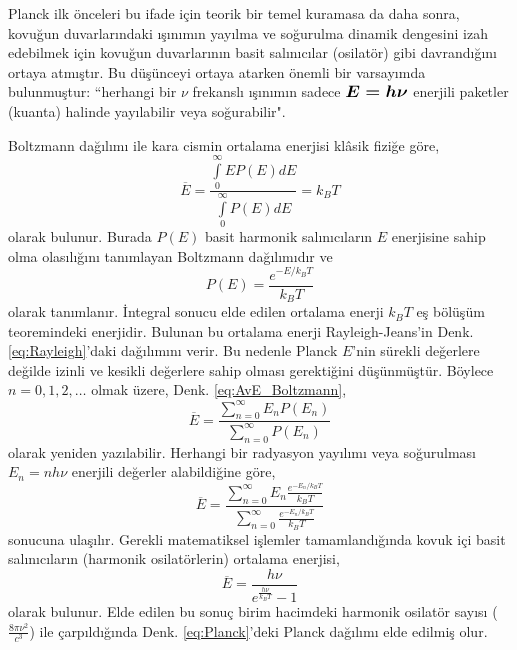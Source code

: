 \documentclass[a4paper,12pt, twoside]{article}
\begin{document}
Planck ilk önceleri bu ifade için teorik bir temel kuramasa da daha sonra, kovuğun duvarlarındaki ışınımın yayılma ve soğurulma dinamik dengesini izah edebilmek için kovuğun duvarlarının basit salınıcılar (osilatör) gibi davrandığını ortaya atmıştır. Bu düşünceyi ortaya atarken önemli bir varsayımda bulunmuştur: ``herhangi bir  $\nu$ frekanslı ışınımın sadece $\large \boldsymbol{E=h\nu}$ enerjili paketler (kuanta) halinde yayılabilir veya soğurabilir".

Boltzmann dağılımı ile kara cismin ortalama enerjisi klâsik fiziğe göre,
\begin{equation}
\label{eq:AvE_Boltzmann}
\overline E =\frac{\int \limits_0^\infty E P(E) dE}{\int \limits_0^\infty P(E) dE} = k_B T
\end{equation} 
olarak bulunur. Burada $P(E)$ basit harmonik salınıcıların $E$ enerjisine sahip olma olasılığını tanımlayan Boltzmann dağılımıdır ve
\begin{equation}
\label{eq:Boltzmann}
P(E) = \frac{e^{-E/k_BT}}{k_BT}
\end{equation} 
olarak tanımlanır. İntegral sonucu elde edilen ortalama enerji $k_B T$ eş bölüşüm teoremindeki enerjidir. Bulunan bu ortalama enerji Rayleigh-Jeans'in Denk. \ref{eq:Rayleigh}'daki dağılımını verir. Bu nedenle Planck $E$'nin sürekli değerlere değilde izinli ve kesikli değerlere sahip olması gerektiğini düşünmüştür. Böylece $n = 0, 1, 2, \dots$  olmak üzere, Denk. \ref{eq:AvE_Boltzmann},
\begin{equation}
\label{eq:Boltzmann_Planck}
\overline E =\frac{\sum \limits_{n=0}^\infty E_n P(E_n)}{\sum \limits_{n=0}^\infty P(E_n)} 
\end{equation}
olarak yeniden yazılabilir. Herhangi bir radyasyon yayılımı veya soğurulması $E_n=n h\nu$ enerjili değerler alabildiğine göre,
\begin{equation}
\label{eq:Boltzmann_Planck}
\overline E =\frac{\sum \limits_{n=0}^\infty E_n \frac{e^{-E_n/k_BT}}{k_BT}}{\sum \limits_{n=0}^\infty \frac{e^{-E_n/k_BT}}{k_BT}} 
\end{equation}
sonucuna ulaşılır. Gerekli matematiksel işlemler tamamlandığında \cite{book:EisbergResnick} kovuk içi basit salınıcıların (harmonik osilatörlerin) ortalama enerjisi,
\begin{equation}
\label{eq:Planck_Av_E}
\overline E = \frac{h\nu}{e^{\frac{h \nu}{k_{B} T}} - 1}
\end{equation}
olarak bulunur. Elde edilen bu sonuç birim hacimdeki harmonik osilatör sayısı ($\frac{8 \pi \nu^{2}}{c^{3}}$) ile çarpıldığında Denk. \ref{eq:Planck}'deki Planck dağılımı elde edilmiş olur. 
\end{document}
